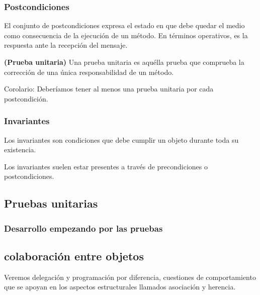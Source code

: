 \documentclass[../main.tex]{subfiles}
\begin{document}
        \subsubsection{Postcondiciones}
            El conjunto de postcondiciones expresa el estado en que debe quedar el medio como consecuencia de la ejecución de un método. En términos operativos, es la respuesta ante la recepción del mensaje.
            
            \begin{definition} \textbf{(Prueba unitaria)}
                Una prueba unitaria es aquélla prueba que comprueba la corrección de una única responsabilidad de un método.

                Corolario: Deberíamos tener al menos una prueba unitaria por cada postcondición.
            \end{definition}
        
        \subsubsection{Invariantes}
            Los invariantes son condiciones que debe cumplir un objeto durante toda su existencia.

            Los invariantes suelen estar presentes a través de precondiciones o postcondiciones.

    \subsection{Pruebas unitarias}
        \subsubsection{Desarrollo empezando por las pruebas}

    \subsection{colaboración entre objetos}
        Veremos delegación y programación por diferencia, cuestiones de comportamiento que se apoyan en los aspectos estructurales llamados asociación y herencia. 
\end{document}
